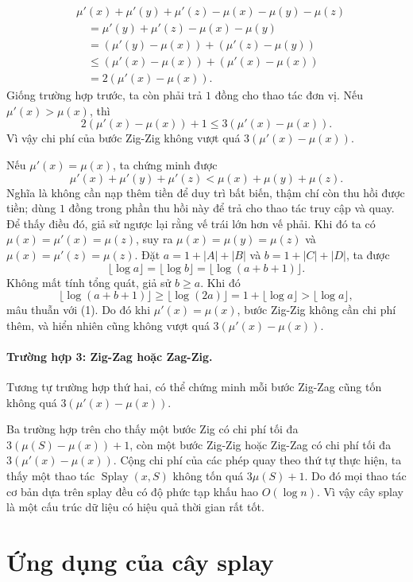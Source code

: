 \documentclass[11pt]{article}
\begin{document}
\[
\begin{aligned}
  &\mu'(x)+\mu'(y)+\mu'(z)-\mu(x)-\mu(y)-\mu(z) \\
  &\quad= \mu'(y)+\mu'(z)-\mu(x)-\mu(y) \\
  &\quad= (\mu'(y)-\mu(x))+(\mu'(z)-\mu(y)) \\
  &\quad\le (\mu'(x)-\mu(x))+(\mu'(x)-\mu(x)) \\
  &\quad= 2(\mu'(x)-\mu(x)).
\end{aligned}
\]
Giống trường hợp trước, ta còn phải trả $1$ đồng cho thao tác đơn vị. Nếu
$\mu'(x)>\mu(x)$, thì
\[
  2(\mu'(x)-\mu(x))+1 \le 3(\mu'(x)-\mu(x)).
\]
Vì vậy chi phí của bước Zig-Zig không vượt quá $3(\mu'(x)-\mu(x))$.

Nếu $\mu'(x)=\mu(x)$, ta chứng minh được
\[
  \mu'(x)+\mu'(y)+\mu'(z)
  < \mu(x)+\mu(y)+\mu(z).
\]
Nghĩa là không cần nạp thêm tiền để duy trì bất biến, thậm chí còn thu hồi
được tiền; dùng $1$ đồng trong phần thu hồi này để trả cho thao tác truy cập
và quay. Để thấy điều đó, giả sử ngược lại rằng vế trái lớn hơn vế phải. Khi
đó ta có $\mu(x)=\mu'(x)=\mu(z)$, suy ra
$\mu(x)=\mu(y)=\mu(z)$ và $\mu(x)=\mu'(z)=\mu(z)$. Đặt
$a=1+|A|+|B|$ và $b=1+|C|+|D|$, ta được
\[
  \lfloor\log a\rfloor
  = \lfloor\log b\rfloor
  = \lfloor\log(a+b+1)\rfloor. \tag{1}
\]
Không mất tính tổng quát, giả sử $b\ge a$. Khi đó
\[
  \lfloor\log(a+b+1)\rfloor
  \ge \lfloor\log(2a)\rfloor
  = 1+\lfloor\log a\rfloor
  > \lfloor\log a\rfloor, \tag{2}
\]
mâu thuẫn với (1). Do đó khi $\mu'(x)=\mu(x)$, bước Zig-Zig không cần chi phí
thêm, và hiển nhiên cũng không vượt quá $3(\mu'(x)-\mu(x))$.

\paragraph{Trường hợp 3: Zig-Zag hoặc Zag-Zig.}
Tương tự trường hợp thứ hai, có thể chứng minh mỗi bước Zig-Zag cũng tốn
không quá $3(\mu'(x)-\mu(x))$.

Ba trường hợp trên cho thấy một bước Zig có chi phí tối đa
$3(\mu(S)-\mu(x))+1$, còn một bước Zig-Zig hoặc Zig-Zag có chi phí tối đa
$3(\mu'(x)-\mu(x))$. Cộng chi phí của các phép quay theo thứ tự thực hiện, ta
thấy một thao tác $\operatorname{Splay}(x,S)$ không tốn quá $3\mu(S)+1$.
Do đó mọi thao tác cơ bản dựa trên splay đều có độ phức tạp khấu hao
$O(\log n)$. Vì vậy cây splay là một cấu trúc dữ liệu có hiệu quả thời gian
rất tốt.

\section{Ứng dụng của cây splay}
\end{document}

